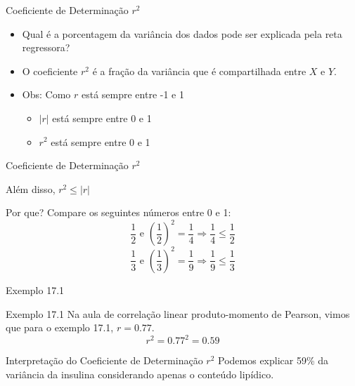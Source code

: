 \documentclass{beamer}
\begin{document}
\begin{frame}{Coeficiente de Determinação $r^2$}
  \begin{block}{}
    \begin{itemize}
      \small
    \item Qual é a porcentagem da variância dos dados pode ser explicada
      pela reta regressora?
      \medskip
    \item O coeficiente $r^2$ é a fração da variância que é
      compartilhada entre $X$ e $Y$.
    \end{itemize}
  \end{block}
    \vfill
    \begin{itemize}
      \small
    \item Obs: Como $r$ está sempre entre -1 e 1
    \begin{itemize}
      \scriptsize
    \item $|r|$ está sempre entre 0 e 1
      \medskip
    \item $r^2$ está sempre entre 0 e 1
    \end{itemize}
  \end{itemize}
\end{frame}

\begin{frame}{Coeficiente de Determinação $r^2$}
  \begin{block}{}
    \centering
    Além disso, $r^2 \le |r|$
  \end{block}
  \bigskip
  \begin{exampleblock}{Por que?}
    \small
    Compare os seguintes números entre 0 e 1:
    \bigskip
    \scriptsize
    \begin{displaymath}
      \frac{1}{2} \text{ e } \left(\frac{1}{2}\right)^2=\frac{1}{4} \Rightarrow
      \frac{1}{4} \le \frac{1}{2}
    \end{displaymath}
    \begin{displaymath}
      \frac{1}{3} \text{ e } \left(\frac{1}{3}\right)^2=\frac{1}{9} \Rightarrow
      \frac{1}{9} \le \frac{1}{3}
    \end{displaymath}
  \end{exampleblock}
\end{frame}

\begin{frame}{Exemplo 17.1}
  \begin{exampleblock}{Exemplo 17.1}
    \small
    Na aula de correlação linear produto-momento de Pearson, vimos que para o exemplo 17.1, $r=0.77$.
    \begin{displaymath}
      r^2 = 0.77^2 = 0.59
    \end{displaymath}
  \end{exampleblock}
        \bigskip
  \begin{exampleblock}{\small Interpretação do Coeficiente de Determinação $r^2$}
    Podemos explicar 59\% da variância da insulina considerando apenas o conteúdo lipídico.
  \end{exampleblock}
\end{frame}
\end{document}

